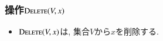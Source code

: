\documentclass[main]{subfiles}
\begin{document}
\begin{frame}\frametitle{操作$\mathrm{\text{D\textsc{elete}}}(V,x)$}
\begin{itemize}
	\item $\mathrm{\text{D\textsc{elete}}}(V,x)$は, 集合$V$から$x$を削除する.\\
\end{itemize}

\begin{columns}[c]
	\begin{column}{0.5\linewidth}
		
	\end{column}
	\begin{column}{0.49\linewidth}
		
	\end{column}
\end{columns}
\end{frame}
\end{document}
